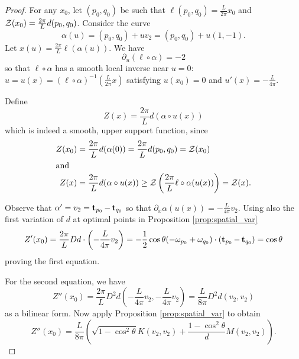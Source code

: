 \documentclass[12pt]{amsart}
\begin{document}
\begin{proof}
For any $x_0$, let $(p_0,q_0)$ be such that $\ell(p_0,q_0) = \tfrac{L}{2\pi} x_0$ and $\operatorname{\mathcal{Z}}(x_0) = \tfrac{2\pi}{L} d(p_0,q_0)$. Consider the curve
\[
\alpha(u) = (p_0, q_0) + uv_2 = (p_0, q_0) + u(1,-1).
\]
Let \(x(u) = \tfrac{2\pi}{L} \ell(\alpha(u))\). We have
\[
\partial_u (\ell \circ \alpha) = -2
\]
so that $\ell\circ\alpha$ has a smooth local inverse near $u=0$: \(u = u(x) = (\ell \circ \alpha)^{-1}(\tfrac{L}{2\pi} x)\) satisfying \(u(x_0) = 0\) and \(u'(x) = -\tfrac{L}{4\pi}\).

Define
\[
Z(x) = \frac{2\pi}{L} d(\alpha \circ u (x))
\]
which is indeed a smooth, upper support function, since
\begin{align*}
Z(x_0) &= \frac{2\pi}{L} d(\alpha(0)) = \frac{2\pi}{L} d(p_0, q_0) = \operatorname{\mathcal{Z}}(x_0) \\
\intertext{and}
Z(x) &= \frac{2\pi}{L} d(\alpha \circ u(x)) \geq \operatorname{\mathcal{Z}} \left(\frac{2\pi}{L}\ell\circ\alpha(u(x))\right) = \operatorname{\mathcal{Z}}(x).
\end{align*}

Observe that $\alpha' = v_2 = \operatorname{\mathbf{t}}_{p_0} - \operatorname{\mathbf{t}}_{q_0}$ so that \(\partial_x \alpha(u(x)) = -\tfrac{L}{4\pi} v_2\). Using also the first variation of $d$ at optimal points in Proposition \ref{prop:spatial_var}
\[
Z'(x_0) = \frac{2\pi}{L} Dd \cdot \left(-\frac{L}{4\pi}v_2\right) = -\frac{1}{2} \cos\theta (-\omega_{p_0} + \omega_{q_0}) \cdot (\operatorname{\mathbf{t}}_{p_0} - \operatorname{\mathbf{t}}_{q_0}) = \cos\theta
\]
proving the first equation.

For the second equation, we have
\[
Z''(x_0) = \frac{2\pi}{L} D^2 d \left(-\frac{L}{4\pi} v_2, -\frac{L}{4\pi} v_2\right) = \frac{L}{8\pi} D^2 d (v_2, v_2)
\]
as a bilinear form. Now apply Proposition \ref{prop:spatial_var} to obtain
\begin{equation}
\label{eq:barrier_secondvar}
Z''(x_0) = \frac{L}{8\pi} \left(\sqrt{1-\cos^2\theta} K (v_2, v_2) + \frac{1-\cos^2\theta}{d} M (v_2, v_2)\right).
\end{equation}


\end{proof}
\end{document}
